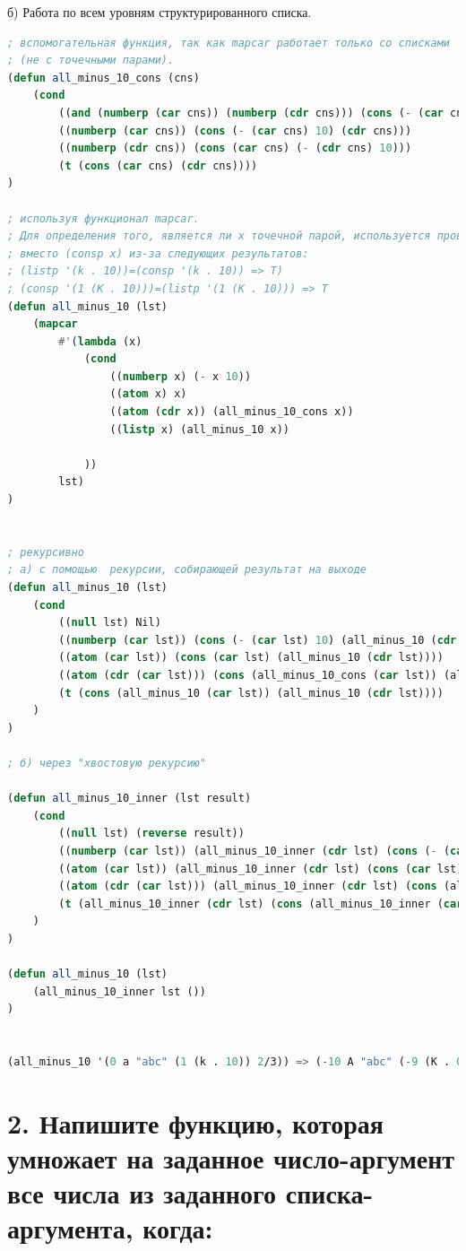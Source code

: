 \documentclass[12pt]{report}
\begin{document}
б) Работа по всем уровням структурированного списка.
\begin{lstlisting}[language=Lisp]
; вспомогательная функция, так как mapcar работает только со списками 
; (не с точечными парами).
(defun all_minus_10_cons (cns)
	(cond 
		((and (numberp (car cns)) (numberp (cdr cns))) (cons (- (car cns) 10) (- (cdr cns) 10)))
		((numberp (car cns)) (cons (- (car cns) 10) (cdr cns)))
		((numberp (cdr cns)) (cons (car cns) (- (cdr cns) 10)))
		(t (cons (car cns) (cdr cns))))
)

; используя функционал mapcar.
; Для определения того, является ли x точечной парой, используется проверка (atom (cdr x)) 
; вместо (consp x) из-за следующих результатов:
; (listp '(k . 10))=(consp '(k . 10)) => T)
; (consp '(1 (K . 10)))=(listp '(1 (K . 10))) => T
(defun all_minus_10 (lst)
	(mapcar 
		#'(lambda (x) 
			(cond 
				((numberp x) (- x 10))
				((atom x) x)
				((atom (cdr x)) (all_minus_10_cons x))
				((listp x) (all_minus_10 x))
				
			))
		lst)
)	


; рекурсивно
; а) с помощью  рекурсии, собирающей результат на выходе
(defun all_minus_10 (lst)
	(cond 
		((null lst) Nil)
		((numberp (car lst)) (cons (- (car lst) 10) (all_minus_10 (cdr lst))))
		((atom (car lst)) (cons (car lst) (all_minus_10 (cdr lst))))
		((atom (cdr (car lst))) (cons (all_minus_10_cons (car lst)) (all_minus_10 (cdr lst))))
		(t (cons (all_minus_10 (car lst)) (all_minus_10 (cdr lst))))
	)
)	

; б) через "хвостовую рекурсию" 

(defun all_minus_10_inner (lst result)
	(cond 
		((null lst) (reverse result))
		((numberp (car lst)) (all_minus_10_inner (cdr lst) (cons (- (car lst) 10) result)))
		((atom (car lst)) (all_minus_10_inner (cdr lst) (cons (car lst) result)))
		((atom (cdr (car lst))) (all_minus_10_inner (cdr lst) (cons (all_minus_10_cons (car lst)) result)))
		(t (all_minus_10_inner (cdr lst) (cons (all_minus_10_inner (car lst) ()) result)))
	)
)

(defun all_minus_10 (lst) 
	(all_minus_10_inner lst ())
)


(all_minus_10 '(0 a "abc" (1 (k . 10)) 2/3)) => (-10 A "abc" (-9 (K . 0)) -28/3)
\end{lstlisting}



\clearpage
\section*{2. Напишите функцию, которая умножает на заданное число-аргумент все числа из заданного списка-аргумента, когда:}
\end{document}

